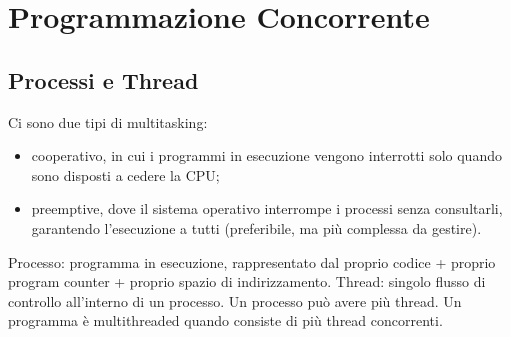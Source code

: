 \chapter{Programmazione Concorrente}

\section{Processi e Thread}
Ci sono due tipi di multitasking: 
\begin{itemize}
\item cooperativo, in cui i programmi in esecuzione vengono interrotti solo quando sono disposti a cedere la CPU;
\item preemptive, dove il sistema operativo interrompe i processi senza consultarli, garantendo l'esecuzione a tutti (preferibile, ma più complessa da gestire).
\end{itemize}

Processo: programma in esecuzione, rappresentato dal proprio codice + proprio program counter + proprio spazio di indirizzamento.
Thread: singolo flusso di controllo all'interno di un processo. Un processo può avere più thread. 
Un programma è multithreaded quando consiste di più thread concorrenti.


